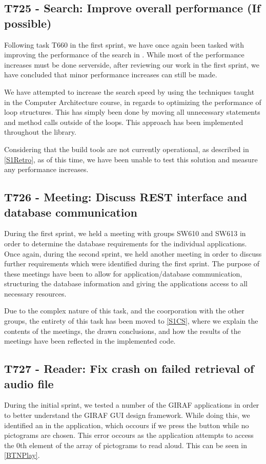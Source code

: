 \subsection{T725 - Search: Improve overall performance (If possible)}
Following task T660 in the first sprint, we have once again been tasked with
improving the performance of the search in . While most
of the performance increases must be done serverside, after reviewing our work
in the first sprint, we have concluded that minor performance increases can
still be made.\nl

We have attempted to increase the search speed by using the techniques taught in
the Computer Architecture course, in regards to optimizing the performance of
loop structures. This has simply been done by moving all unnecessary statements
and method calls outside of the loops. This approach has been implemented
throughout the  library.\nl

Considering that the build tools are not currently operational, as described in
\autoref{S1Retro}, as of this time, we have been unable to test this solution
and measure any performance increases.

\subsection{T726 - Meeting: Discuss REST interface and database communication}
During the first sprint, we held a meeting with groups SW610 and SW613 in order
to determine the database requirements for the individual applications. Once
again, during the second sprint, we held another meeting in order to discuss
further requirements which were identified during the first sprint. The purpose
of these meetings have been to allow for application/database communication,
structuring the database information and giving the applications access to all
necessary resources.\nl

Due to the complex nature of this task, and the coorporation with the other
groups, the entirety of this task has been moved to \autoref{S1CS}, where we
explain the contents of the meetings, the drawn conclusions, and how the results
of the meetings have been reflected in the implemented code.


\subsection{T727 - Reader: Fix crash on failed retrieval of audio file}
\label{T727}
During the initial sprint, we tested a number of the GIRAF
applications in order to better understand the GIRAF GUI design framework. While doing this, we
identified an  in the 
application, which occours if we press the  button while no
pictograms are chosen. This error occours as the application attempts to access
the 0th element of the array of pictograms to read aloud. This can be seen in
\autoref{BTNPlay}.\nl

